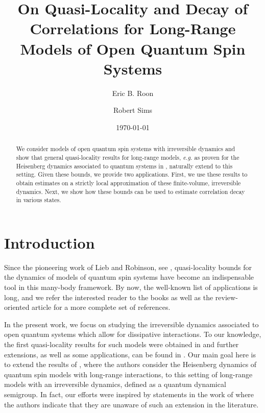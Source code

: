 \documentclass{article}
\newcommand{\<}{\langle}
\renewcommand{\>}{\rangle}
\numberwithin{equation}{section}
\theoremstyle{definition}
\begin{document}
\title{On Quasi-Locality and Decay of Correlations for Long-Range Models of Open Quantum Spin Systems}
\author{Eric B. Roon}
\author{Robert 
Sims}


\date{\today}              
\renewcommand\Affilfont{\itshape\small}
\maketitle

\begin{abstract}
We consider models of open quantum spin systems with irreversible dynamics and show
that general quasi-locality results for long-range models, \textit{e.g.} as proven for the Heisenberg dynamics
associated to quantum systems in \cite{Matsuta}, naturally extend to this setting. 
Given these bounds, we provide two applications. First, we use these results to obtain 
estimates on a strictly local approximation of these finite-volume, irreversible dynamics.
Next, we show how these bounds can be used to estimate correlation decay in various states.

\end{abstract}
\tableofcontents

\section{Introduction}


Since the pioneering work of Lieb and Robinson, see \cite{LiebRobinson},  quasi-locality bounds for the dynamics of
models of quantum spin systems have become an indispensable tool in this many-body framework.
By now, the well-known list of applications is long, and we refer the interested reader to the books \cite{BratteliRobinson_2, Naaijkens} as well as the 
review-oriented article \cite{NachtergaeleSimsYoung} for a more complete set of references.

In the present work, we focus on studying the irreversible dynamics associated to open quantum systems which allow for dissipative interactions.
To our knowledge, the first quasi-locality results for such models were obtained in \cite{Hastings} and further extensions, as well as some applications, can be found in \cite{BarthelKliesch, Cubitt, KastoryanoEisert, Kliesch_CTT, Kliesch_LRB, Lucia, NachtergaeleVershyninaZagrebnov, Sweke}. 
Our main goal here is to extend the results of \cite{Matsuta}, where the authors consider the Heisenberg dynamics of quantum spin models with 
long-range interactions, to this setting of long-range models with an irreversible dynamics, defined as a quantum dynamical semigroup. 
In fact, our efforts were inspired by statements in the work of \cite{Sweke} where the authors indicate that they are unaware of such an extension in the literature.
\end{document}
